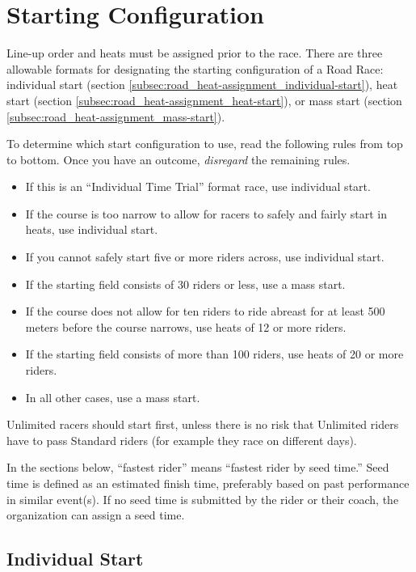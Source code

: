 \section{Starting Configuration}

Line-up order and heats must be assigned prior to the race.
There are three allowable formats for designating the starting configuration of a Road Race: 
individual start (section \ref{subsec:road_heat-assignment_individual-start}), 
heat start (section \ref{subsec:road_heat-assignment_heat-start}), or mass start (section \ref{subsec:road_heat-assignment_mass-start}).

To determine which start configuration to use, read the following rules from top to bottom.
Once you have an outcome, \emph{disregard} the remaining rules.
\begin{itemize}
\item If this is an ``Individual Time Trial'' format race, use individual start.
\item If the course is too narrow to allow for racers to safely and fairly start in heats, use individual start.
\item If you cannot safely start five or more riders across, use individual start.
\item If the starting field consists of 30 riders or less, use a mass start.
\item If the course does not allow for ten riders to ride abreast for at least 500 meters before the course narrows, use heats of 12 or more riders.
\item If the starting field consists of more than 100 riders, use heats of 20 or more riders.
\item In all other cases, use a mass start.
\end{itemize}

Unlimited racers should start first, unless there is no risk that Unlimited riders have to pass Standard riders (for example they race on different days).

In the sections below, ``fastest rider'' means ``fastest rider by seed time.'' Seed time is defined as an estimated finish time, 
preferably based on past performance in similar event(s).
If no seed time is submitted by the rider or their coach, the organization can assign a seed time.

\subsection{Individual Start \label{subsec:road_heat-assignment_individual-start}}


